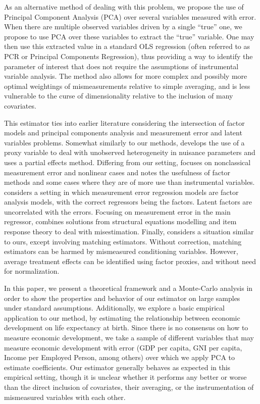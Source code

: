 \documentclass[10pt]{article}
\begin{document}
        As an alternative method of dealing with this problem, we propose the use of Principal Component Analysis (PCA) over several variables measured with error. When there are multiple observed variables driven by a single ``true'' one, we propose to use PCA over these variables to extract the ``true'' variable. One may then use this extracted value in a standard OLS regression (often referred to as PCR or Principal Components Regression), thus providing a way to identify the parameter of interest that does not require the assumptions of instrumental variable analysis. The method also allows for more complex and possibly more optimal weightings of mismeasurements relative to simple averaging, and is less vulnerable to the curse of dimensionality relative to the inclusion of many covariates.

        This estimator ties into earlier literature considering the intersection of factor models and principal components analysis and measurement error and latent variables problems. Somewhat similarly to our methods, \cite{nagasawa_identication_2020} develops the use of a proxy variable to deal with unobserved heterogeneity in nuisance parameters and uses a partial effects method. Differing from our setting, \cite{schennach_recent_2016} focuses on nonclassical measurement error and nonlinear cases and notes the usefulness of factor methods and some cases where they are of more use than instrumental variables. \cite{wegge_local_1996} considers a setting in which measurement error regression models are factor analysis models, with the correct regressors being the factors. Latent factors are uncorrelated with the errors. Focusing on measurement error in the main regressor, \cite{schofield_correcting_2015} combines solutions from structural equations modelling and item response theory to deal with misestimation. Finally, \cite{heckman_matching_2010} considers a situation similar to ours, except involving matching estimators. Without correction, matching estimators can be harmed by mismeasured conditioning variables. However, average treatment effects can be identified using factor proxies, and without need for normalization.

        In this paper, we present a theoretical framework and a Monte-Carlo analysis in order to show the properties and behavior of our estimator on large samples under standard assumptions. Additionally, we explore a basic empirical application to our method, by estimating the relationship between economic development on life expectancy at birth. Since there is no consensus on how to measure economic development, we take a sample of different variables that may measure economic development with error (GDP per capita, GNI per capita, Income per Employed Person, among others) over which we apply PCA to estimate coefficients. Our estimator generally behaves as expected in this empirical setting, though it is unclear whether it performs any better or worse than the direct inclusion of covariates, their averaging, or the instrumentation of mismeasured variables with each other.
\end{document}
